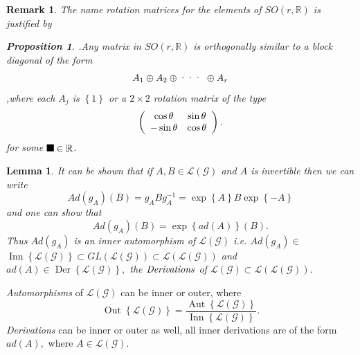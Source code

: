 \documentclass[aps,preprint]{revtex4}%
\providecommand{\U}[1]{\protect\rule{.1in}{.1in}}
\newtheorem{lemma}[theorem]{Lemma}
\newtheorem{proposition}[theorem]{Proposition}
\newtheorem{remark}[theorem]{Remark}
\begin{document}
\begin{remark}
The name rotation matrices for the elements of $SO\left(  r,\mathbb{R}\right)
$ is justified by

\begin{proposition}
.Any matrix in $SO\left(  r,\mathbb{R}\right)  $ is \emph{orthogonally
similar} to a block diagonal of the form%
\begin{equation}
A_{1}\oplus A_{2}\oplus\text{\textperiodcentered\textperiodcentered
\textperiodcentered}\ \oplus A_{r}%
\end{equation}
,where each $A_{j}$ is $\left\{  1\right\}  $ or a $2\times2$ rotation matrix
of the type%
\begin{equation}
\left(
\begin{array}
[c]{cc}%
\cos\theta & \sin\theta\\
-\sin\theta & \cos\theta
\end{array}
\right)  .
\end{equation}
for some $\U{3b8} \in\mathbb{R}$.
\end{proposition}
\end{remark}

\begin{lemma}
It can be shown that if $A,B\in\mathcal{L}\left(  \mathcal{G}\right)  $ and
$A$ is invertible then we can write
\begin{equation}
Ad\left(  g_{A}\right)  \left(  B\right)  =g_{A}Bg_{A}^{-1}=\exp\left\{
A\right\}  B\exp\left\{  -A\right\}
\end{equation}
and one can show that
\begin{equation}
Ad\left(  g_{A}\right)  \left(  B\right)  =\exp\left\{  ad\left(  A\right)
\right\}  \left(  B\right)  .
\end{equation}
Thus $Ad\left(  g_{A}\right)  $ is an \emph{inner automorphism} of
$\mathcal{L}\left(  \mathcal{G}\right)  $ i.e. $Ad\left(  g_{A}\right)  \in$
$\operatorname*{Inn}\left\{  \mathcal{L}\left(  \mathcal{G}\right)  \right\}
\subset GL\left(  \mathcal{L}\left(  \mathcal{G}\right)  \right)
\subset\mathcal{L}\left(  \mathcal{L}\left(  \mathcal{G}\right)  \right)  $
and $ad\left(  A\right)  \in\operatorname{Der}\left\{  \mathcal{L}\left(
\mathcal{G}\right)  \right\}  ,$ the $\emph{Derivations}$ of $\mathcal{L}%
\left(  \mathcal{G}\right)  \subset\mathcal{L}\left(  \mathcal{L}\left(
\mathcal{G}\right)  \right)  .$
\end{lemma}

\emph{Automorphisms} of $\mathcal{L}\left(  \mathcal{G}\right)  $ can be inner
or outer, where
\begin{equation}
\operatorname*{Out}\left\{  \mathcal{L}\left(  \mathcal{G}\right)  \right\}
=\frac{\operatorname{Aut}\left\{  \mathcal{L}\left(  \mathcal{G}\right)
\right\}  }{\operatorname*{Inn}\left\{  \mathcal{L}\left(  \mathcal{G}\right)
\right\}  }.
\end{equation}
\emph{Derivations} can be inner or outer as well, all inner derivations are of
the form $ad\left(  A\right)  ,$ where $A\in\mathcal{L}\left(  \mathcal{G}%
\right)  $.
\end{document}
